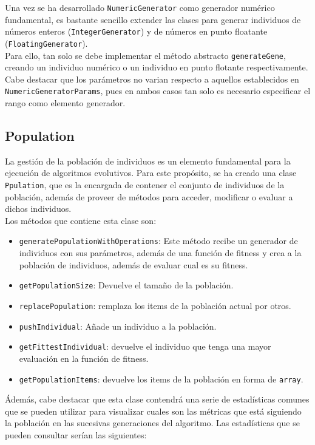 Una vez se ha desarrollado \texttt{NumericGenerator} como generador numérico fundamental, es bastante sencillo extender las clases para generar individuos de números enteros (\texttt{IntegerGenerator}) y de números en punto floatante (\texttt{FloatingGenerator}). \\

Para ello, tan solo se debe implementar el método abstracto \texttt{generateGene}, creando un individuo numérico o un individuo en punto flotante respectivamente. Cabe destacar que los parámetros no varian respecto a aquellos establecidos en \texttt{NumericGeneratorParams}, pues en ambos casos tan solo es necesario especificar el rango como elemento generador.

\subsection{Population}

La gestión de la población de individuos es un elemento fundamental para la ejecución de algoritmos evolutivos. Para este propósito, se ha creado una clase \texttt{Ppulation}, que es la encargada de contener el conjunto de individuos de la población, además de proveer de métodos para acceder, modificar o evaluar a dichos individuos. \\

Los métodos que contiene esta clase son:

\begin{itemize}
    \item \texttt{generatePopulationWithOperations}: Este método recibe un generador de individuos con sus parámetros, además de una función de fitness y crea a la población de individuos, además de evaluar cual es su fitness.
    \item \texttt{getPopulationSize}: Devuelve el tamaño de la población.
    \item \texttt{replacePopulation}: remplaza los items de la población actual por otros.
    \item \texttt{pushIndividual}: Añade un individuo a la población.
    \item \texttt{getFittestIndividual}: devuelve el individuo que tenga una mayor evaluación en la función de fitness.
    \item \texttt{getPopulationItems}: devuelve los items de la población en forma de \texttt{array}.
\end{itemize}

Ádemás, cabe destacar que esta clase contendrá una serie de estadísticas comunes que se pueden utilizar para visualizar cuales son las métricas que está siguiendo la población en las sucesivas generaciones del algoritmo. Las estadísticas que se pueden consultar serían las siguientes:

